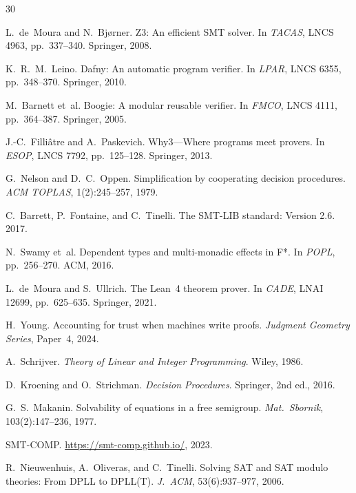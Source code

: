 \documentclass[11pt]{article}
\begin{document}
\begin{thebibliography}{30}

L.~de~Moura and N.~Bj\o{}rner.
\newblock Z3: An efficient SMT solver.
\newblock In \emph{TACAS}, LNCS 4963, pp.~337--340. Springer, 2008.

K.~R.~M.~Leino.
\newblock Dafny: An automatic program verifier.
\newblock In \emph{LPAR}, LNCS 6355, pp.~348--370. Springer, 2010.

M.~Barnett et~al.
\newblock Boogie: A modular reusable verifier.
\newblock In \emph{FMCO}, LNCS 4111, pp.~364--387. Springer, 2005.

J.-C.~Filli\^atre and A.~Paskevich.
\newblock Why3---Where programs meet provers.
\newblock In \emph{ESOP}, LNCS 7792, pp.~125--128. Springer, 2013.

G.~Nelson and D.~C.~Oppen.
\newblock Simplification by cooperating decision procedures.
\newblock \emph{ACM TOPLAS}, 1(2):245--257, 1979.

C.~Barrett, P.~Fontaine, and C.~Tinelli.
\newblock The SMT-LIB standard: Version 2.6. 2017.

N.~Swamy et~al.
\newblock Dependent types and multi-monadic effects in {F*}.
\newblock In \emph{POPL}, pp.~256--270. ACM, 2016.

L.~de~Moura and S.~Ullrich.
\newblock The {Lean}~4 theorem prover.
\newblock In \emph{CADE}, LNAI 12699, pp.~625--635. Springer, 2021.

H.~Young.
\newblock Accounting for trust when machines write proofs.
\newblock \emph{Judgment Geometry Series}, Paper~4, 2024.

A.~Schrijver.
\newblock \emph{Theory of Linear and Integer Programming}.
\newblock Wiley, 1986.

D.~Kroening and O.~Strichman.
\newblock \emph{Decision Procedures}. Springer, 2nd ed., 2016.

G.~S.~Makanin.
\newblock Solvability of equations in a free semigroup.
\newblock \emph{Mat.\ Sbornik}, 103(2):147--236, 1977.

SMT-COMP. \url{https://smt-comp.github.io/}, 2023.

R.~Nieuwenhuis, A.~Oliveras, and C.~Tinelli.
\newblock Solving SAT and SAT modulo theories: From DPLL to DPLL(T).
\newblock \emph{J.\ ACM}, 53(6):937--977, 2006.


\end{thebibliography}
\end{document}
